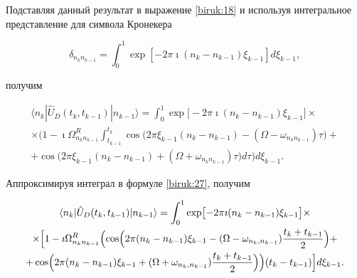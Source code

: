 Подставляя данный результат в выражение \eqref{biruk:18} и используя интегральное представление для символа Кронекера

$$

\delta_{n_k n_{k-1}} = \int _{0}^{1}\exp[-2\pi \imath (n_k-n_{k-1})\xi_{k-1}] d\xi_{k-1},

$$

получим

\begin{multline}

\label{biruk:27}

\langle n_k| \hat{U}_D(t_{k},t_{k-1})| n_{k-1}\rangle=

\int_{0}^{1} \exp\bigl[-2\pi \imath (n_k-n_{k-1})\xi_{k-1}\bigr] 

\times

\\

\times

\biggl(1-\imath \Omega_{n_k n_{k-1}}^R 

\int _{t_{k-1}}^{t_{k}}\cos\bigl(2\pi \xi_{k-1} (n_{k}-n_{k-1}) - (\Omega-\omega_{n_{k} n_{k-1}})\tau \bigr)

+

\\

+

\cos\bigl(2\pi \xi_{k-1} (n_{k}-n_{k-1}) + (\Omega+\omega_{n_{k} n_{k-1}})\tau \bigr)d\tau\biggr)d\xi_{k-1}. 

\end{multline}



Аппроксимируя интеграл в формуле \eqref{biruk:27}, получим

\begin{multline}

\label{biruk:28}

\langle n_k| \hat{U}_D(t_{k},t_{k-1})| n_{k-1}\rangle=

\int_{0}^{1} \exp\bigl[-2\pi \imath (n_k-n_{k-1})\xi_{k-1}\bigr]

\times

\\

\times

\Bigl[

1-\imath \Omega_{n_k n_{k-1}}^R 

\Bigl(\cos\Bigr(2\pi (n_k-n_{k-1})\xi_{k-1}-(\Omega-\omega_{n_k,n_{k-1}})\frac{t_{k}+t_{k-1}}{2}\Bigr)

+

\\

+

\cos\Bigl(2\pi (n_k-n_{k-1})\xi_{k-1}+(\Omega+\omega_{n_k,n_{k-1}})\frac{t_{k}+t_{k-1}}{2}\Bigr)\Bigr)(t_{k}-t_{k-1})

\Bigr]d\xi_{k-1}. 

\end{multline}



